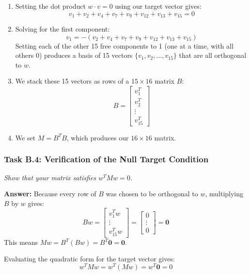 \documentclass[11pt]{article}
\begin{document}
\begin{enumerate}
    \item Setting the dot product $w \cdot v = 0$ using our target vector gives:
    \[
    v_1 + v_2 + v_4 + v_7 + v_9 + v_{12} + v_{13} + v_{15} = 0
    \]
    \item Solving for the first component:
    \[
    v_1 = -(v_2 + v_4 + v_7 + v_9 + v_{12} + v_{13} + v_{15})
    \]
    Setting each of the other 15 free components to 1 (one at a time, with all others 0) produces a basis of 15 vectors $\{v_1, v_2, \dots, v_{15}\}$ that are all orthogonal to $w$.
    \item We stack these 15 vectors as rows of a $15 \times 16$ matrix $B$:
    \[
    B = \begin{bmatrix} v_1^T \\ v_2^T \\ \vdots \\ v_{15}^T \end{bmatrix}
    \]
    \item We set $M = B^T B$, which produces our $16 \times 16$ matrix.
\end{enumerate}

\vspace{0.8em}

\subsubsection*{Task B.4: Verification of the Null Target Condition}
\textit{Show that your matrix satisfies $w^T M w = 0$.}

\vspace{0.4em}
\textbf{Answer:}
Because every row of $B$ was chosen to be orthogonal to $w$, multiplying $B$ by $w$ gives:
\[
B w = \begin{bmatrix} v_1^T w \\ \vdots \\ v_{15}^T w \end{bmatrix} = \begin{bmatrix} 0 \\ \vdots \\ 0 \end{bmatrix} = \mathbf{0}
\]
This means $M w = B^T (B w) = B^T \mathbf{0} = \mathbf{0}$.

Evaluating the quadratic form for the target vector gives:
\[
w^T M w = w^T (M w) = w^T \mathbf{0} = 0
\]

\vspace{0.8em}
\end{document}
